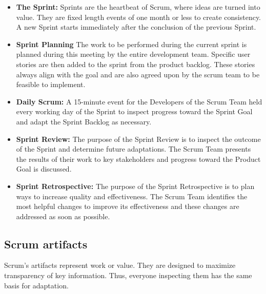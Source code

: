 \begin{itemize}
    \item \textbf{The Sprint:} Sprints are the heartbeat of Scrum, where ideas are turned into value.
          They are fixed length events of one month or less to create consistency. A new Sprint starts
          immediately after the conclusion of the previous Sprint.
    \item \textbf{Sprint Planning} The work to be performed during the current sprint is planned during
          this meeting by the entire development team. Specific user stories are then added to the sprint from
          the product backlog. These stories always align with the goal and are also agreed upon by the scrum
          team to be feasible to implement.
    \item \textbf{Daily Scrum:} A 15-minute event for the Developers of the Scrum Team
          held every working day of the Sprint to inspect progress toward the Sprint Goal and adapt the Sprint
          Backlog as necessary.
    \item \textbf{Sprint Review:} The purpose of the Sprint Review is to inspect the outcome of the
          Sprint and determine future adaptations. The Scrum Team presents the results of their work to key
          stakeholders and progress toward the Product Goal is discussed.
    \item \textbf{Sprint Retrospective:} The purpose of the Sprint Retrospective is to plan ways to
          increase quality and effectiveness. The Scrum Team identifies the most helpful changes to improve
          its effectiveness and these changes are addressed as soon as possible.
\end{itemize}


\subsection{Scrum artifacts}
Scrum’s artifacts represent work or value. They are designed to maximize transparency of key information.
Thus, everyone inspecting them has the same basis for adaptation.

